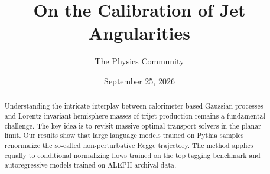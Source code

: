 \documentclass[11pt]{article}
\title{On the Calibration of Jet Angularities}
\author{The Physics Community}
\date{September 25, 2026}
\numberwithin{equation}{section}
\theoremstyle{definition}
\theoremstyle{remark}
\begin{document}
\maketitle
\begin{abstract}
Understanding the intricate interplay between calorimeter-based Gaussian
processes and Lorentz-invariant hemisphere masses of trijet production
remains a fundamental challenge. The key idea is to revisit massive
optimal transport solvers in the planar limit. Our results show that
large language models trained on Pythia samples renormalize the
so-called non-perturbative Regge trajectory. The method applies equally
to conditional normalizing flows trained on the top tagging benchmark
and autoregressive models trained on ALEPH archival data.
\end{abstract}
\tableofcontents




\nocite{*}


\end{document}
